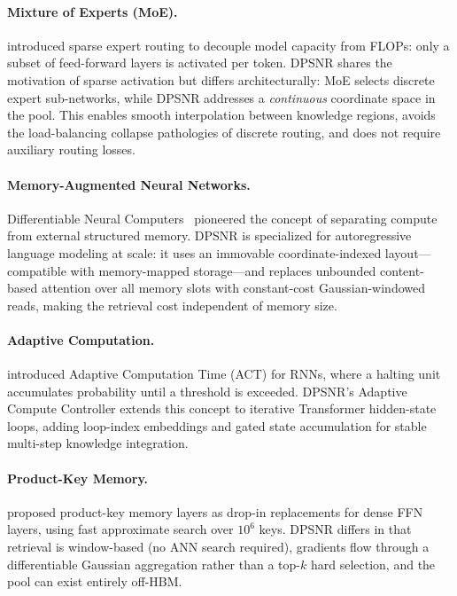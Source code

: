 \documentclass[11pt]{article}
\begin{document}
\paragraph{Mixture of Experts (MoE).}
\citet{shazeer2017moe} introduced sparse expert routing to decouple model
capacity from FLOPs: only a subset of feed-forward layers is activated per
token.
DPSNR shares the motivation of sparse activation but differs architecturally:
MoE selects discrete expert sub-networks, while DPSNR addresses a
\emph{continuous} coordinate space in the pool.
This enables smooth interpolation between knowledge regions, avoids the
load-balancing collapse pathologies of discrete routing, and does not require
auxiliary routing losses.

\paragraph{Memory-Augmented Neural Networks.}
Differentiable Neural Computers~\citep{graves2016dnc} pioneered the concept
of separating compute from external structured memory.
DPSNR is specialized for autoregressive language modeling at scale: it
uses an immovable coordinate-indexed layout—compatible with memory-mapped
storage—and replaces unbounded content-based attention over all memory
slots with constant-cost Gaussian-windowed reads, making the retrieval
cost independent of memory size.

\paragraph{Adaptive Computation.}
\citet{graves2016act} introduced Adaptive Computation Time (ACT) for RNNs,
where a halting unit accumulates probability until a threshold is exceeded.
DPSNR's Adaptive Compute Controller extends this concept to iterative
Transformer hidden-state loops, adding loop-index embeddings and gated state
accumulation for stable multi-step knowledge integration.

\paragraph{Product-Key Memory.}
\citet{lample2019pkm} proposed product-key memory layers as drop-in
replacements for dense FFN layers, using fast approximate search over $10^6$
keys.
DPSNR differs in that retrieval is window-based (no ANN search required),
gradients flow through a differentiable Gaussian aggregation rather than a
top-$k$ hard selection, and the pool can exist entirely off-HBM.
\end{document}
